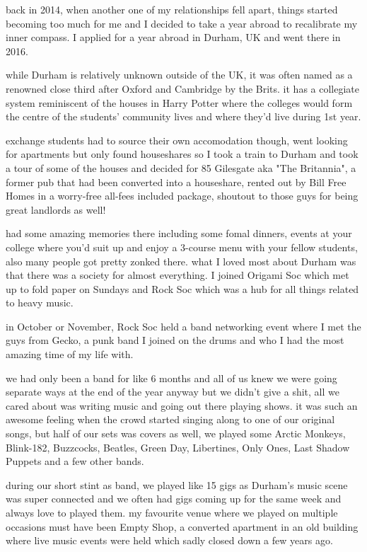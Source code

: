 \documentclass[12pt]{report}
\theoremstyle{definition}
\theoremstyle{remark}
\begin{document}
back in 2014, when another one of my relationships fell apart, things started becoming too much for me and I decided to take a year abroad to recalibrate my inner compass. I applied for a year abroad in Durham, UK and went there in 2016.

while Durham is relatively unknown outside of the UK, it was often named as a renowned close third after Oxford and Cambridge by the Brits. it has a collegiate system reminiscent of the houses in Harry Potter where the colleges would form the centre of the students' community lives and where they'd live during 1st year.

exchange students had to source their own accomodation though, went looking for apartments but only found houseshares so I took a train to Durham and took a tour of some of the houses and decided for 85 Gilesgate aka "The Britannia", a former pub that had been converted into a houseshare, rented out by Bill Free Homes in a worry-free all-fees included package, shoutout to those guys for being great landlords as well!

had some amazing memories there including some fomal dinners, events at your college where you'd suit up and enjoy a 3-course menu with your fellow students, also many people got pretty zonked there. what I loved most about Durham was that there was a society for almost everything. I joined Origami Soc which met up to fold paper on Sundays and Rock Soc which was a hub for all things related to heavy music.

in October or November, Rock Soc held a band networking event where I met the guys from Gecko, a punk band I joined on the drums and who I had the most amazing time of my life with.

we had only been a band for like 6 months and all of us knew we were going separate ways at the end of the year anyway but we didn't give a shit, all we cared about was writing music and going out there playing shows. it was such an awesome feeling when the crowd started singing along to one of our original songs, but half of our sets was covers as well, we played some Arctic Monkeys, Blink-182, Buzzcocks, Beatles, Green Day, Libertines, Only Ones, Last Shadow Puppets and a few other bands.

during our short stint as band, we played like 15 gigs as Durham's music scene was super connected and we often had gigs coming up for the same week and always love to played them. my favourite venue where we played on multiple occasions must have been Empty Shop, a converted apartment in an old building where live music events were held which sadly closed down a few years ago.
\end{document}
